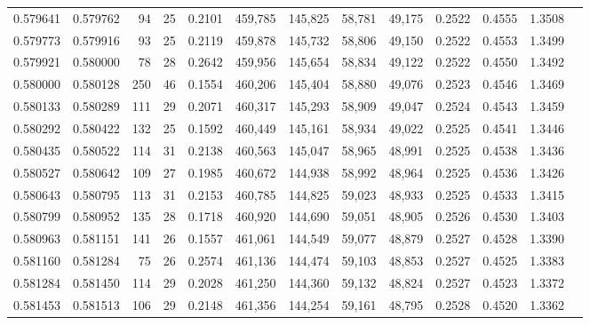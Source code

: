 \begin{tabular}{rrrrrrrrrrrrr}
0.579641 & 0.579762 &     94 &    25 &                                     0.2101 & 459,785 & 145,825 &  58,781 &  49,175 & 0.2522 & 0.4555 & 1.3508 \\
0.579773 & 0.579916 &     93 &    25 &                                     0.2119 & 459,878 & 145,732 &  58,806 &  49,150 & 0.2522 & 0.4553 & 1.3499 \\
0.579921 & 0.580000 &     78 &    28 &                                     0.2642 & 459,956 & 145,654 &  58,834 &  49,122 & 0.2522 & 0.4550 & 1.3492 \\
0.580000 & 0.580128 &    250 &    46 &                                     0.1554 & 460,206 & 145,404 &  58,880 &  49,076 & 0.2523 & 0.4546 & 1.3469 \\
0.580133 & 0.580289 &    111 &    29 &                                     0.2071 & 460,317 & 145,293 &  58,909 &  49,047 & 0.2524 & 0.4543 & 1.3459 \\
0.580292 & 0.580422 &    132 &    25 &                                     0.1592 & 460,449 & 145,161 &  58,934 &  49,022 & 0.2525 & 0.4541 & 1.3446 \\
0.580435 & 0.580522 &    114 &    31 &                                     0.2138 & 460,563 & 145,047 &  58,965 &  48,991 & 0.2525 & 0.4538 & 1.3436 \\
0.580527 & 0.580642 &    109 &    27 &                                     0.1985 & 460,672 & 144,938 &  58,992 &  48,964 & 0.2525 & 0.4536 & 1.3426 \\
0.580643 & 0.580795 &    113 &    31 &                                     0.2153 & 460,785 & 144,825 &  59,023 &  48,933 & 0.2525 & 0.4533 & 1.3415 \\
0.580799 & 0.580952 &    135 &    28 &                                     0.1718 & 460,920 & 144,690 &  59,051 &  48,905 & 0.2526 & 0.4530 & 1.3403 \\
0.580963 & 0.581151 &    141 &    26 &                                     0.1557 & 461,061 & 144,549 &  59,077 &  48,879 & 0.2527 & 0.4528 & 1.3390 \\
0.581160 & 0.581284 &     75 &    26 &                                     0.2574 & 461,136 & 144,474 &  59,103 &  48,853 & 0.2527 & 0.4525 & 1.3383 \\
0.581284 & 0.581450 &    114 &    29 &                                     0.2028 & 461,250 & 144,360 &  59,132 &  48,824 & 0.2527 & 0.4523 & 1.3372 \\
0.581453 & 0.581513 &    106 &    29 &                                     0.2148 & 461,356 & 144,254 &  59,161 &  48,795 & 0.2528 & 0.4520 & 1.3362 \\

\end{tabular}
